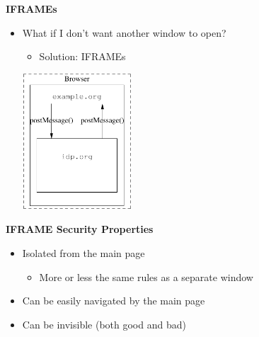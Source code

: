 \documentclass[helvetica]{seminar}
\newcommand{\heading}[1]{%
  \begin{center} 
    \large\bf 
    #1 
  \end{center} 
  \vspace{.4 in}}
\begin{document}
\begin{slide}
\heading{IFRAMEs}

\begin{itemize}
\item What if I don't want another window to open?
  \begin{itemize}
  \item Solution: IFRAMEs
  \end{itemize}

  \begin{center}
  \includegraphics[height=2in]{iframe}
  \end{center}

\end{itemize}
\end{slide}


\begin{slide}
\heading{IFRAME Security Properties}

\begin{itemize}
\item Isolated from the main page
  \begin{itemize}
  \item More or less the same rules as a separate window
  \end{itemize}

\item Can be easily navigated by the main page
\item Can be invisible (both good and bad)
\end{itemize}
\end{slide}
\end{document}
